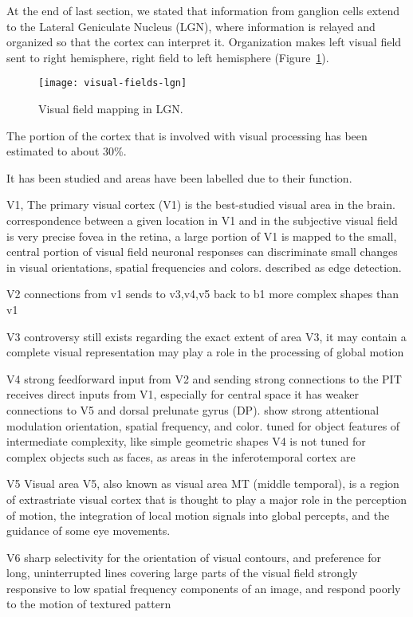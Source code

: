 At the end of last section, we stated that information from ganglion cells extend to the Lateral Geniculate Nucleus (LGN), where information is relayed and organized so that the cortex can interpret it. Organization makes left visual field sent to right hemisphere, right field to left hemisphere (Figure~\ref{fig:vision:optic-chiasm}).

\begin{figure}
  \begin{center}
    \texttt{[image: visual-fields-lgn]}
    \caption{Visual field mapping in LGN.}
    \label{fig:vision:optic-chiasm}
  \end{center}
\end{figure}

The portion of the cortex that is involved with visual processing has been estimated to about 30\%.

It has been studied and areas have been labelled due to their function.

V1, 
The primary visual cortex (V1) is the best-studied visual area in the brain.
correspondence between a given location in V1 and in the subjective visual field is very precise
 fovea in the retina, a large portion of V1 is mapped to the small, central portion of visual field
neuronal responses can discriminate small changes in visual orientations, spatial frequencies and colors. 
described as edge detection. 

V2
connections from v1 sends to v3,v4,v5 back to b1
more complex shapes than v1

V3
controversy still exists regarding the exact extent of area V3,
 it may contain a complete visual representation
  may play a role in the processing of global motion
  
V4
strong feedforward input from V2 and sending strong connections to the PIT
receives direct inputs from V1, especially for central space
it has weaker connections to V5 and dorsal prelunate gyrus (DP).
show strong attentional modulation
orientation, spatial frequency, and color.
tuned for object features of intermediate complexity, like simple geometric shapes
V4 is not tuned for complex objects such as faces, as areas in the inferotemporal cortex are

V5
Visual area V5, also known as visual area MT (middle temporal), is a region of extrastriate visual cortex that is thought to play a major role in the perception of motion, the integration of local motion signals into global percepts, and the guidance of some eye movements.


V6
sharp selectivity for the orientation of visual contours, and preference for long, uninterrupted lines covering large parts of the visual field
strongly responsive to low spatial frequency components of an image, and respond poorly to the motion of textured pattern
